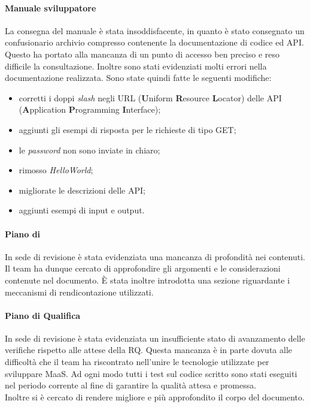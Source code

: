 \paragraph*{Manuale sviluppatore}
La consegna del manuale è stata insoddisfacente, in quanto è stato consegnato un confusionario archivio compresso contenente la documentazione di codice ed API. Questo ha portato alla mancanza di un punto di accesso ben preciso e reso difficile la consultazione. Inoltre sono stati evidenziati molti errori nella documentazione realizzata. Sono state quindi fatte le seguenti modifiche:
\begin{itemize}
\item corretti i doppi \textit{slash} negli URL (\textbf{U}niform \textbf{R}esource \textbf{L}ocator) delle API (\textbf{A}pplication \textbf{P}rogramming \textbf{I}nterface);
\item aggiunti gli esempi di risposta per le richieste di tipo GET;
\item le \textit{password} non sono inviate in chiaro;
\item rimosso \textit{HelloWorld};
\item migliorate le descrizioni delle API;
\item aggiunti esempi di input e output.
\end{itemize}

\paragraph*{Piano di }
In sede di revisione è stata evidenziata una mancanza di profondità nei contenuti. Il team ha dunque cercato di approfondire gli argomenti e le considerazioni contenute nel documento. È stata inoltre introdotta una sezione riguardante i meccanismi di rendicontazione utilizzati.

\paragraph*{Piano di Qualifica}
In sede di revisione è stata evidenziata un insufficiente stato di avanzamento delle verifiche rispetto alle attese della RQ. Questa mancanza è in parte dovuta alle difficoltà che il team ha riscontrato nell'unire le tecnologie utilizzate per sviluppare MaaS. Ad ogni modo tutti i test sul codice scritto sono stati eseguiti nel periodo corrente al fine di garantire la qualità attesa e promessa. \\
Inoltre si è cercato di rendere migliore e più approfondito il corpo del documento.
